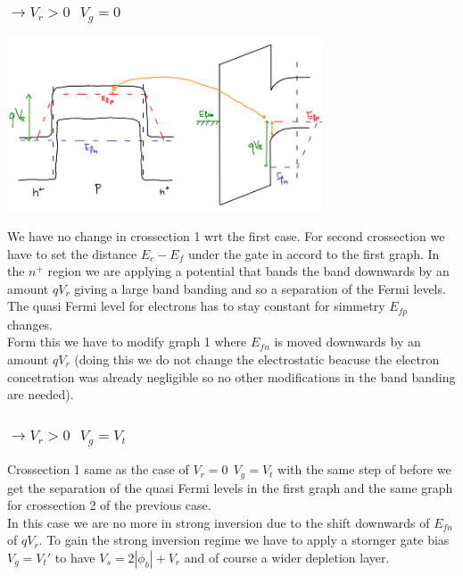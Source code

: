 \subsubsection{$\rightarrow V_r>0 \ \ \ V_g=0$}

\centering
\includegraphics[width=0.7\textwidth]{what2.png}\\
\raggedright

We have no change in crossection 1 wrt the first case.
For second crossection we have to set the distance $E_c-E_f$ under the gate in accord to the first graph. In the $n^+$ region we are applying a potential that bands the band downwards by an amount $qV_r$ giving a large band banding and so a separation of the Fermi levels.\\
The quasi Fermi level for electrons has to stay constant for simmetry $E_{fp}$ changes.\\
Form this we have to modify graph 1 where $E_{fn}$ is moved downwards by an amount $qV_r$ (doing this we do not change the electrostatic beacuse the electron concetration was already negligible so no other modifications in the band banding are needed).\\

\subsubsection{$\rightarrow V_r>0 \ \ \  V_g=V_t$}
Crossection 1 same as the case of $V_r=0 \ \ V_g=V_t$ with the same step of before we get the separation of the quasi Fermi levels in the first graph and the same graph for crossection 2 of the previous case.\\
In this case we are no more in strong inversion due to the shift downwards of $E_{fn}$ of $qV_r$. To gain the strong inversion regime we have to apply a stornger gate bias $V_g=V_t'$ to have $V_s=2|\phi_b|+V_r$ and of course a wider depletion layer.\\

